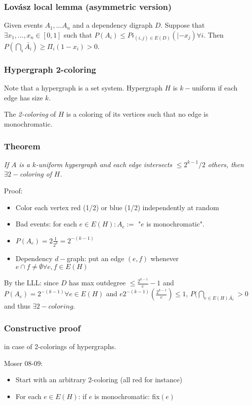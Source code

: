 \documentclass[11pt]{book}
\begin{document}
\subsubsection{Lovász local lemma (asymmetric version)}
Given events $A_1,...A_n$ and a dependency digraph $D$.
Suppose that $\exists x_1, ..., x_n \in [0,1]$ such that $P(A_i) \leq Pi_{(i,j) \in E(D)}( |- x_j) \forall i$. Then $P(\bigcap_i \bar{A_i}) \geq \Pi_i (1 - x_i) > 0$.

\subsubsection{Hypergraph 2-coloring}
Note that a hypergraph is a set system. Hypergraph $H$ is $k-$uniform if each edge has size $k$.

The \textit{2-coloring} of $H$ is a coloring of its vertices such that no edge is monochromatic.

\subsubsection{Theorem} 
\textit{If $A$ is a $k$-uniform hypergraph and each edge intersects $\leq 2^{k-1}/2$ others, then $\exists 2-$coloring of $H$.}

Proof: \begin{itemize}
	\item Color each vertex red (1/2) or blue (1/2) independently at random
	\item Bad events: for each $e \in E(H) : A_e := $ "$e$ is monochromatic".
	\item $P(A_e) = 2 \frac{1}{2^k} = 2^{-(k-1)}$
	\item Dependency $d-$graph: put an edge $(e,f)$ whenever $e \cap f \neq \emptyset \forall e, f \in E(H)$
\end{itemize}

By the LLL: since $D$ has max outdegree $\leq \frac{2^{k-1}}{e} -1$ and $P(A_e) = 2^{-(k-1)} \forall e \in E(H)$ and $e 2^{-(k-1)} \left( \frac{2^{k-1}}{e} \right) \leq 1$, $P(\bigcap_{e \in E(H) \bar{A_e}} > 0$ and thus $\exists 2-coloring$.

\subsubsection{Constructive proof}
in case of 2-colorings of hypergraphs.

Moser 08-09:
\begin{itemize}
	\item Start with an arbitrary 2-coloring (all red for instance)
	\item For each $e \in E(H)$: if $e$ is monochromatic: fix$(e)$
\end{itemize}
\end{document}
